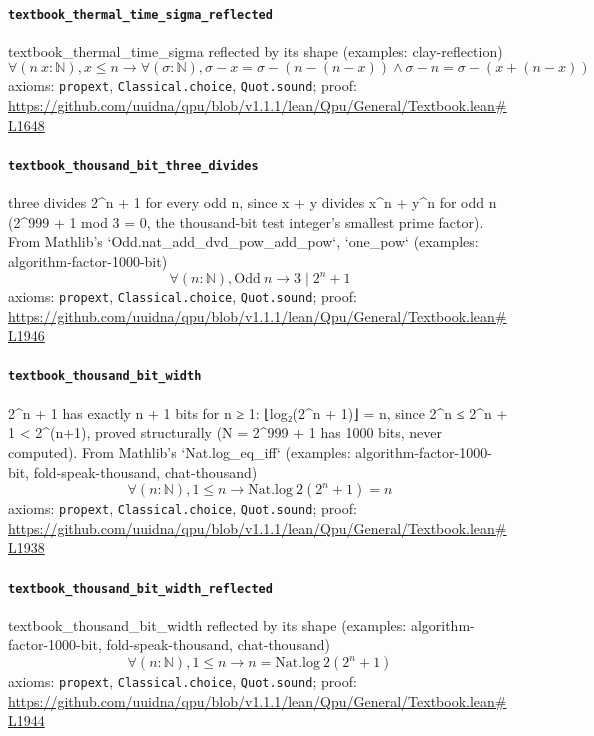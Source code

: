 \documentclass[11pt]{article}
\begin{document}
\paragraph{\texttt{textbook\_thermal\_time\_sigma\_reflected}}
textbook\_thermal\_time\_sigma reflected by its shape (examples: clay-reflection)
\[ \forall (n\ x : \mathbb{N}), x \le n \to \forall (\sigma : \mathbb{N}), \sigma - x = \sigma - (n - (n - x)) \land \sigma - n = \sigma - (x + (n - x)) \]
\noindent axioms: \texttt{propext}, \texttt{Classical.choice}, \texttt{Quot.sound}; proof: \url{https://github.com/uuidna/qpu/blob/v1.1.1/lean/Qpu/General/Textbook.lean\#L1648}

\paragraph{\texttt{textbook\_thousand\_bit\_three\_divides}}
three divides 2\^{}n + 1 for every odd n, since x + y divides x\^{}n + y\^{}n for odd n (2\^{}999 + 1 mod 3 = 0, the thousand-bit test integer's smallest prime factor). From Mathlib's `Odd.nat\_add\_dvd\_pow\_add\_pow`, `one\_pow` (examples: algorithm-factor-1000-bit)
\[ \forall (n : \mathbb{N}), \mathrm{Odd}\ n \to 3 \mid 2 ^{n} + 1 \]
\noindent axioms: \texttt{propext}, \texttt{Classical.choice}, \texttt{Quot.sound}; proof: \url{https://github.com/uuidna/qpu/blob/v1.1.1/lean/Qpu/General/Textbook.lean\#L1946}

\paragraph{\texttt{textbook\_thousand\_bit\_width}}
2\^{}n + 1 has exactly n + 1 bits for n ≥ 1: ⌊log₂(2\^{}n + 1)⌋ = n, since 2\^{}n ≤ 2\^{}n + 1 < 2\^{}(n+1), proved structurally (N = 2\^{}999 + 1 has 1000 bits, never computed). From Mathlib's `Nat.log\_eq\_iff` (examples: algorithm-factor-1000-bit, fold-speak-thousand, chat-thousand)
\[ \forall (n : \mathbb{N}), 1 \le n \to \mathrm{Nat.log}\ 2 (2 ^{n} + 1) = n \]
\noindent axioms: \texttt{propext}, \texttt{Classical.choice}, \texttt{Quot.sound}; proof: \url{https://github.com/uuidna/qpu/blob/v1.1.1/lean/Qpu/General/Textbook.lean\#L1938}

\paragraph{\texttt{textbook\_thousand\_bit\_width\_reflected}}
textbook\_thousand\_bit\_width reflected by its shape (examples: algorithm-factor-1000-bit, fold-speak-thousand, chat-thousand)
\[ \forall (n : \mathbb{N}), 1 \le n \to n = \mathrm{Nat.log}\ 2 (2 ^{n} + 1) \]
\noindent axioms: \texttt{propext}, \texttt{Classical.choice}, \texttt{Quot.sound}; proof: \url{https://github.com/uuidna/qpu/blob/v1.1.1/lean/Qpu/General/Textbook.lean\#L1944}
\end{document}
